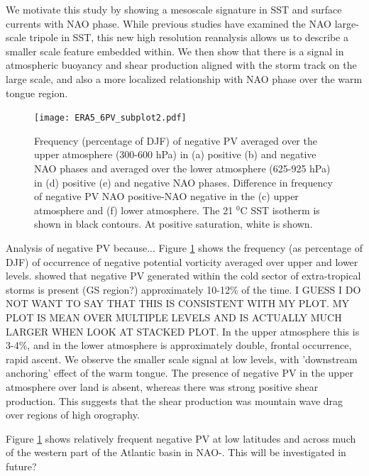 We motivate this study by showing a mesoscale signature in SST and surface currents with NAO phase. While previous studies have examined the NAO large-scale tripole in SST, this new high resolution reanalysis allows us to describe a smaller scale feature embedded within. We then show that there is a signal in atmospheric buoyancy and shear production aligned with the storm track on the large scale, and also a more localized relationship with NAO phase over the warm tongue region.


\begin{figure}[h]
	\centering
	\texttt{[image: ERA5\_6PV\_subplot2.pdf]}
	\caption{Frequency (percentage of DJF) of negative PV averaged over the upper atmosphere (300-600 hPa) in (a) positive (b) and negative NAO phases and averaged over the lower atmosphere (625-925 hPa) in (d) positive (e) and negative NAO phases. Difference in frequency of negative PV NAO positive-NAO negative in the (c) upper atmosphere and (f) lower atmosphere. The 21 $^{0}$C SST isotherm is shown in black contours. At positive saturation, white is shown.}
	\label{fig:ERA5_PV_count_cent}
\end{figure}

Analysis of negative PV because...
Figure \ref{fig:ERA5_PV_count_cent} shows the frequency (as percentage of DJF) of occurrence of negative potential vorticity averaged over upper and lower levels. \citet{vanniere2016potential} showed that negative PV generated within the cold sector of extra-tropical storms is present (GS region?) approximately 10-12\% of the time. I GUESS I DO NOT WANT TO SAY THAT THIS IS CONSISTENT WITH MY PLOT. MY PLOT IS MEAN OVER MULTIPLE LEVELS AND IS ACTUALLY MUCH LARGER WHEN LOOK AT STACKED PLOT. In the upper atmosphere this is 3-4\%, and in the lower atmosphere is approximately double, frontal occurrence, rapid ascent. We observe the smaller scale signal at low levels, with 'downstream anchoring’ effect of the warm tongue. The presence of negative PV in the upper atmosphere over land is absent, whereas there was strong positive shear production. This suggests that the shear production was mountain wave drag over regions of high orography.

Figure \ref{fig:ERA5_PV_count_cent} shows relatively frequent negative PV at low latitudes and across much of the western part of the Atlantic basin in NAO-. This will be investigated in future?

